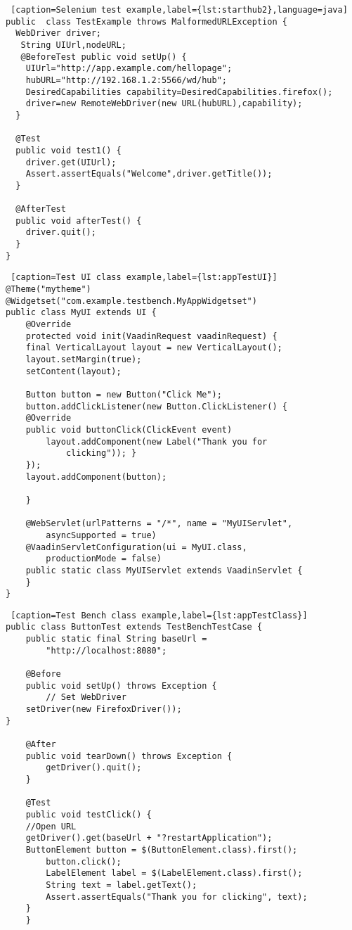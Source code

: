  \lstset{style=a1listing}
  \begin{lstlisting} [caption=Selenium test example,label={lst:starthub2},language=java]
public  class TestExample throws MalformedURLException {
  WebDriver driver;
   String UIUrl,nodeURL;
   @BeforeTest public void setUp() {
    UIUrl="http://app.example.com/hellopage"; 
    hubURL="http://192.168.1.2:5566/wd/hub";
    DesiredCapabilities capability=DesiredCapabilities.firefox();
    driver=new RemoteWebDriver(new URL(hubURL),capability);
  }
    
  @Test
  public void test1() {
    driver.get(UIUrl);
    Assert.assertEquals("Welcome",driver.getTitle());
  }
  
  @AfterTest
  public void afterTest() {
    driver.quit();
  }
}
  \end{lstlisting}	 
	 
\lstset{style=a1listing}
\begin{lstlisting} [caption=Test UI class example,label={lst:appTestUI}]
@Theme("mytheme")
@Widgetset("com.example.testbench.MyAppWidgetset")
public class MyUI extends UI {
	@Override
	protected void init(VaadinRequest vaadinRequest) {
	final VerticalLayout layout = new VerticalLayout();
	layout.setMargin(true);
	setContent(layout);

	Button button = new Button("Click Me");
	button.addClickListener(new Button.ClickListener() {
	@Override
	public void buttonClick(ClickEvent event) 
		layout.addComponent(new Label("Thank you for
			clicking")); }
	});
	layout.addComponent(button);

	}
    
	@WebServlet(urlPatterns = "/*", name = "MyUIServlet",
		asyncSupported = true)
	@VaadinServletConfiguration(ui = MyUI.class,
		productionMode = false)
	public static class MyUIServlet extends VaadinServlet {
	}
}
\end{lstlisting}

\lstset{style=a1listing}
\begin{lstlisting} [caption=Test Bench class example,label={lst:appTestClass}]
public class ButtonTest extends TestBenchTestCase {
	public static final String baseUrl =
		"http://localhost:8080";
    
	@Before
	public void setUp() throws Exception {
		// Set WebDriver
	setDriver(new FirefoxDriver());
}

	@After
	public void tearDown() throws Exception {
		getDriver().quit();
	}
    
	@Test
	public void testClick() {
	//Open URL
	getDriver().get(baseUrl + "?restartApplication");
	ButtonElement button = $(ButtonElement.class).first();
		button.click();
		LabelElement label = $(LabelElement.class).first();
		String text = label.getText();
		Assert.assertEquals("Thank you for clicking", text);
	}
    }
\end{lstlisting}


